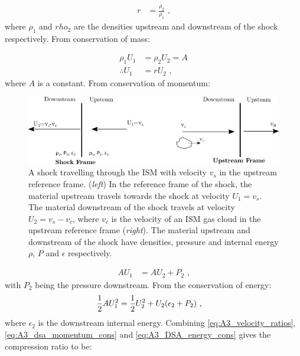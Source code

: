 \begin{equation}
    \begin{aligned}
        r&=\frac{\rho_2}{\rho_1}\text{ ,}
    \end{aligned}
\end{equation}
\noindent where $\rho_1$ and $rho_2$ are the densities upstream and downstream of the shock respectively. From conservation of mass:

\begin{equation}
    \begin{aligned}
        \rho_1U_{1}&=\rho_2U_2=A \\
        \therefore U_{1}&=rU_{2}\text{ ,}
    \end{aligned} \label{eq:A3_velocity_ratios}
\end{equation}
\noindent where $A$ is a constant. From conservation of momentum:
\begin{figure}[!b]
	\centering
	\includegraphics[width=1.0\textwidth]{A3_Diffusive_Shock_Acceleration/Images/upstream_downstream.png}
	\caption{A shock travelling through the ISM with velocity $v_s$ in the upstream reference frame. (\textit{left}) In the reference frame of the shock, the material upstream travels towards the shock at velocity $U_1=v_s$. The material downstream of the shock travels at velocity $U_2=v_s-v_c$, where $v_c$ is the velocity of an ISM gas cloud in the upstream reference frame (\textit{right}). The material upstream and downstream of the shock have densities, pressure and internal energy $\rho$, $P$ and $\epsilon$ respectively.}
	\label{fig:A3_shock_dynamics2}
\end{figure}
\begin{subequations}
    \begin{alignat}{1}
        AU_{1}&=AU_{2}+P_2\text{ ,}
    \end{alignat} \label{eq:A3_dsa_momentum_cons}
\end{subequations}
\noindent with $P_2$ being the pressure downstream. From the conservation of energy:
\begin{equation}
    \begin{aligned}
        \frac{1}{2}AU_{1}^2&=\frac{1}{2}U_{2}^2+U_{2}\qty(\epsilon_2+P_2)\text{ ,}
    \end{aligned} \label{eq:A3_DSA_energy_cons}
\end{equation}
\noindent where $\epsilon_2$ is the downstream internal energy. Combining \autoref{eq:A3_velocity_ratios}, \autoref{eq:A3_dsa_momentum_cons} and \autoref{eq:A3_DSA_energy_cons} gives the compression ratio to be:

